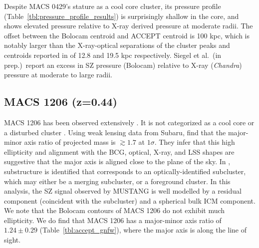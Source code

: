 \documentclass[iop,numberedappendix,apj]{emulateapj}
\begin{document}
Despite MACS 0429's stature as a cool core cluster, its pressure profile
(Table~\ref{tbl:pressure_profile_results}) is surprisingly shallow in the core, and shows elevated pressure relative to
X-ray derived pressure at moderate radii. The offset between the Bolocam centroid \citep{sayers2013} and ACCEPT
\citep{cavagnolo2009} centroid is 100 kpc, which is notably larger than the X-ray-optical separations of the cluster
peaks and centroids reported in \citet{mann2012} of 12.8 and 19.5 kpc respectively. %
Siegel et al.\ (in prep.)\
report an excess in SZ pressure (Bolocam) relative to X-ray (\emph{Chandra}) pressure at moderate to large radii.



\subsection{MACS 1206 (z=0.44)}
\label{sec:results_m1206}


MACS 1206 has been observed extensively \citep[e.g.][]{ebeling2001,ebeling2009,gilmour2009,umetsu2012,
zitrin2012a,biviano2013,sayers2013}. It is not categorized as a cool core or a disturbed cluster
\citep{sayers2013}. Using weak lensing data from Subaru, \citet{umetsu2012} find that the major-minor 
axis ratio of projected mass is $\gtrsim 1.7$ at $1\sigma$. They infer that this high ellipticity and 
alignment with the BCG, optical, X-ray, and LSS shapes are suggestive that the major axis is aligned 
close to the plane of the sky. In \citet{young2014}, substructure is identified that corresponds to an 
optically-identified subcluster, which may either be a merging subcluster, or a foreground cluster. 
In this analysis, the SZ signal observed by MUSTANG is well modelled by a residual component (coincident 
with the subcluster) and a spherical bulk ICM component. We note that the Bolocam contours of MACS 1206
do not exhibit much ellipticity. We do find that MACS 1206 has a major-minor axis 
ratio of $1.24 \pm 0.29$ (Table~\ref{tbl:accept_gnfw}), where the major axis is along the line of sight.
\end{document}
